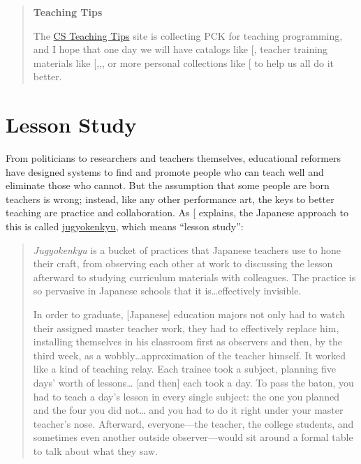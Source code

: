 \begin{quote}\setlength{\parindent}{0pt}
\textbf{Teaching Tips}

The \href{http://csteachingtips.org/}{CS Teaching Tips} site is collecting PCK for
teaching programming, and I hope that one day we will have catalogs
like {[}\protect[\hyperlink{b:Ojos2015}{Ojos2015}]{]}, teacher training materials like
{[},,\protect[\hyperlink{b:Sent2018}{Sent2018}]{]}, or more
personal collections like {[}\protect[\hyperlink{b:Gelm2002}{Gelm2002}]{]} to help us all do it
better.
\end{quote}

\section{Lesson Study}\label{s:performance-jugyokenkyu}

From politicians to researchers and teachers themselves, educational
reformers have designed systems to find and promote people who can teach
well and eliminate those who cannot. But the assumption that some people
are born teachers is wrong; instead, like any other performance art, the
keys to better teaching are practice and collaboration. As
{[}\protect[\hyperlink{b:Gree2014}{Gree2014}]{]} explains, the Japanese approach to this is called
\protect\hyperlink{g:jugyokenkyu}{jugyokenkyu}, which means ``lesson study'':

\begin{quote}\setlength{\parindent}{0pt}
\emph{Jugyokenkyu} is a bucket of practices that Japanese teachers use to
hone their craft, from observing each other at work to discussing the
lesson afterward to studying curriculum materials with colleagues. The
practice is so pervasive in Japanese schools that it
is\ldots{}effectively invisible.

In order to graduate, {[}Japanese{]} education majors not only had to
watch their assigned master teacher work, they had to effectively
replace him, installing themselves in his classroom first as
observers and then, by the third week, as a wobbly\ldots{}approximation
of the teacher himself. It worked like a kind of teaching
relay. Each trainee took a subject, planning five days' worth of
lessons\ldots{} {[}and then{]} each took a day. To pass the baton, you had to
teach a day's lesson in every single subject: the one you planned
and the four you did not\ldots{} and you had to do it right under your
master teacher's nose. Afterward, everyone---the teacher, the
college students, and sometimes even another outside
observer---would sit around a formal table to talk about what they
saw.
\end{quote}

